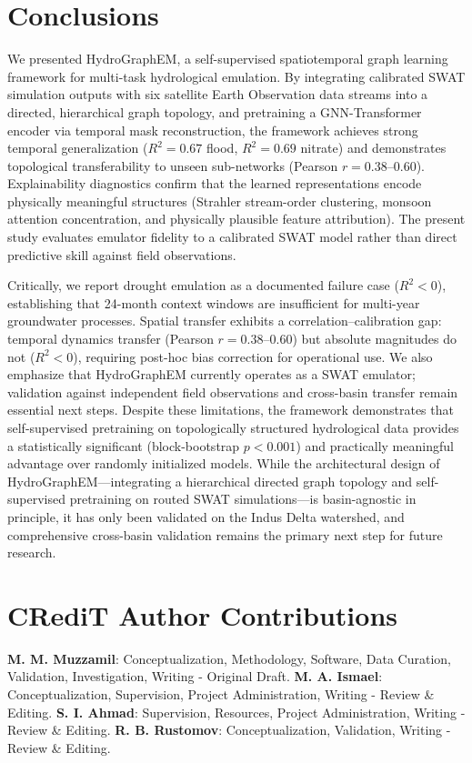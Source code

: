 \documentclass[preprint,12pt]{elsarticle}
\begin{document}
\section{Conclusions}
We presented HydroGraphEM, a self-supervised spatiotemporal graph learning framework for multi-task hydrological emulation. By integrating calibrated SWAT simulation outputs with six satellite Earth Observation data streams into a directed, hierarchical graph topology, and pretraining a GNN-Transformer encoder via temporal mask reconstruction, the framework achieves strong temporal generalization ($R^2 = 0.67$ flood, $R^2 = 0.69$ nitrate) and demonstrates topological transferability to unseen sub-networks (Pearson $r = 0.38$--$0.60$). Explainability diagnostics confirm that the learned representations encode physically meaningful structures (Strahler stream-order clustering, monsoon attention concentration, and physically plausible feature attribution). The present study evaluates emulator fidelity to a calibrated SWAT model rather than direct predictive skill against field observations.

Critically, we report drought emulation as a documented failure case ($R^2 < 0$), establishing that 24-month context windows are insufficient for multi-year groundwater processes. Spatial transfer exhibits a correlation--calibration gap: temporal dynamics transfer (Pearson $r = 0.38$--$0.60$) but absolute magnitudes do not ($R^2 < 0$), requiring post-hoc bias correction for operational use. We also emphasize that HydroGraphEM currently operates as a SWAT emulator; validation against independent field observations and cross-basin transfer remain essential next steps. Despite these limitations, the framework demonstrates that self-supervised pretraining on topologically structured hydrological data provides a statistically significant (block-bootstrap $p < 0.001$) and practically meaningful advantage over randomly initialized models. While the architectural design of HydroGraphEM---integrating a hierarchical directed graph topology and self-supervised pretraining on routed SWAT simulations---is basin-agnostic in principle, it has only been validated on the Indus Delta watershed, and comprehensive cross-basin validation remains the primary next step for future research.

\section*{CRediT Author Contributions}
\textbf{M. M. Muzzamil}: Conceptualization, Methodology, Software, Data Curation, Validation, Investigation, Writing - Original Draft. \textbf{M. A. Ismael}: Conceptualization, Supervision, Project Administration, Writing - Review \& Editing. \textbf{S. I. Ahmad}: Supervision, Resources, Project Administration, Writing - Review \& Editing. \textbf{R. B. Rustomov}: Conceptualization, Validation, Writing - Review \& Editing.
\end{document}
